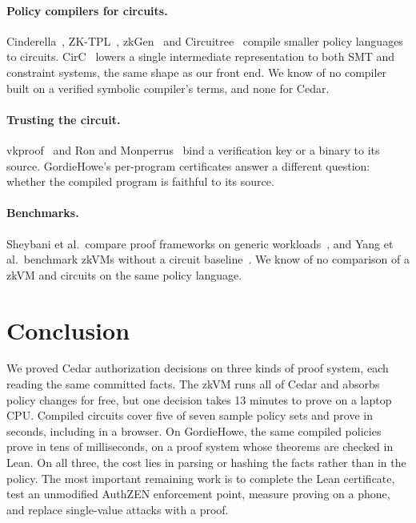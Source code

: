 \documentclass[11pt]{article}
\begin{document}
\paragraph{Policy compilers for circuits.} Cinderella~\citep{delignat2016cinderella}, ZK-TPL~\citep{more2022zktpl}, zkGen~\citep{lauinger2024zkgen} and Circuitree~\citep{circuitree2022} compile smaller policy languages to circuits. CirC~\citep{ozdemir2022circ} lowers a single intermediate representation to both SMT and constraint systems, the same shape as our front end. We know of no compiler built on a verified symbolic compiler's terms, and none for Cedar.

\paragraph{Trusting the circuit.} vkproof~\citep{vkproof2026} and Ron and Monperrus~\citep{ron2026zkcompilation} bind a verification key or a binary to its source. GordieHowe's per-program certificates answer a different question: whether the compiled program is faithful to its source.

\paragraph{Benchmarks.} Sheybani et al.\ compare proof frameworks on generic workloads~\citep{sheybani2025frameworks}, and Yang et al.\ benchmark zkVMs without a circuit baseline~\citep{yang2026sok}. We know of no comparison of a zkVM and circuits on the same policy language.

\section{Conclusion}

We proved Cedar authorization decisions on three kinds of proof system, each reading the same committed facts. The zkVM runs all of Cedar and absorbs policy changes for free, but one decision takes 13 minutes to prove on a laptop CPU. Compiled circuits cover five of seven sample policy sets and prove in seconds, including in a browser. On GordieHowe, the same compiled policies prove in tens of milliseconds, on a proof system whose theorems are checked in Lean. On all three, the cost lies in parsing or hashing the facts rather than in the policy. The most important remaining work is to complete the Lean certificate, test an unmodified AuthZEN enforcement point, measure proving on a phone, and replace single-value attacks with a proof.
\end{document}
